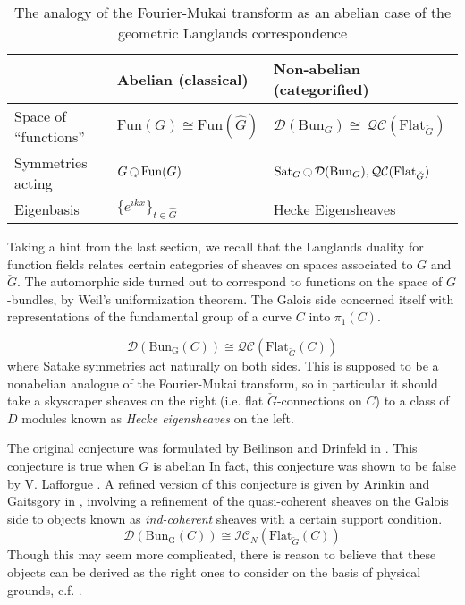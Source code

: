  
\begin{table}[h!]
	\centering
\begin{tabularx}{\textwidth}{|>{\hsize}Y|Y|>{\hsize}Y|}
	\hline
	& Abelian (classical) & Non-abelian (categorified)\\
	\hline
	Space of ``functions'' & $\mathrm{Fun}(G) \cong \mathrm{Fun}(\hat G)$ & $\mathcal D (\mathrm{Bun}_G) \cong \, \mathcal{QC}(\mathrm{Flat}_{\check G})$\\
	Symmetries acting & $G \lacts \mathrm{Fun}(G)$ & $\mathrm{Sat}_G \lacts \mathcal D (\mathrm{Bun}_G), \mathcal{QC}(\mathrm{Flat}_{\check G})$\\
	Eigenbasis & $\{e^{ikx}\}_{t \in \hat G}$ & Hecke Eigensheaves\\
	\hline
	\end{tabularx}
\caption{The analogy of the Fourier-Mukai transform as an abelian case of the geometric Langlands correspondence}
\label{tab:geometric_langlands}
\end{table}


Taking a hint from the last section, we recall that the Langlands duality for function fields relates certain categories of sheaves on spaces associated to $G$ and $\check G$. The automorphic side turned out to correspond to functions on the space of $G$-bundles, by Weil's uniformization theorem. The Galois side concerned itself with representations of the fundamental group of a curve $C$ into $\pi_1(C)$. 


\begin{equation}
	\mathcal D (\mathrm{Bun_G}(C)) \cong \mathcal{QC} (\mathrm{Flat}_{\check G} (C))
\end{equation}
where Satake symmetries act naturally on both sides. This is supposed to be a nonabelian analogue of the Fourier-Mukai transform, so in particular it should take a skyscraper sheaves on the right (i.e. flat $\check G$-connections on $C$) to a class of $D$ modules known as \emph{Hecke eigensheaves} on the left. 

The original conjecture was formulated by Beilinson and Drinfeld in \cite{beilinson1991}. This conjecture is true when $G$ is abelian 
In fact, this conjecture was shown to be false by V. Lafforgue \cite{lafforgue2009}.
A refined version of this conjecture is given by Arinkin and Gaitsgory in \cite{arinkin2015}, involving a refinement of the quasi-coherent sheaves on the Galois side to objects known as \emph{ind-coherent} sheaves with a certain support condition. 
\begin{equation}
	\mathcal D (\mathrm{Bun_G}(C)) \cong \mathcal{IC}_{N} (\mathrm{Flat}_{\check G} (C))
\end{equation}
Though this may seem more complicated, there is reason to believe that these objects can be derived as the right ones to consider on the basis of physical grounds, c.f. \cite{elliott2017}. 

